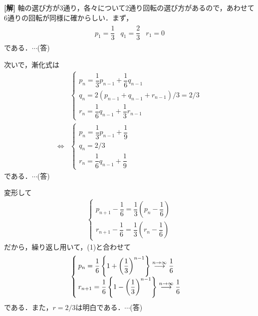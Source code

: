 \documentclass[a4j]{jarticle}
\begin{document}
\setlength{\columnseprule}{0.4pt}
\begin{multicols}{2}
{\bf[解]} 軸の選び方が$3$通り，各々について$2$通り回転の選び方があるので，あわせて$6$通りの回転が同様に確からしい．まず，
     \begin{align*}
          \begin{array}{lll}
          p_1=\dfrac{1}{3}&q_1=\dfrac{2}{3}&r_1=0
          \end{array}
     \end{align*}
である．$\cdots$(答)

次いで，漸化式は
     \begin{align*}
          &\begin{cases}
          p_n=\dfrac{1}{3}p_{n-1}+\dfrac{1}{6}q_{n-1} \\
          q_n=2(p_{n-1}+q_{n-1}+r_{n-1})/3=2/3 \\
          r_n=\dfrac{1}{6}q_{n-1}+\dfrac{1}{3}r_{n-1}
          \end{cases} \\
          \Longleftrightarrow
          &\begin{cases}
          p_n=\dfrac{1}{3}p_{n-1}+\dfrac{1}{9} \\
          q_n=2/3 \\
          r_n=\dfrac{1}{6}q_{n-1}+\dfrac{1}{9}
          \end{cases}
     \end{align*}
である．$\cdots$(答)

変形して
     \begin{align*}
          \begin{cases}
          p_{n+1}-\dfrac{1}{6}=\dfrac{1}{3}\left(p_n-\dfrac{1}{6}\right) \\
          r_{n+1}-\dfrac{1}{6}=\dfrac{1}{3}\left(r_n-\dfrac{1}{6}\right) 
          \end{cases}
     \end{align*}
だから，繰り返し用いて，(1)と合わせて
     \begin{align*}
          \begin{cases}
          p_n=\dfrac{1}{6}\left\{1+\left(\dfrac{1}{3}\right)^{n-1}\right\}\stackrel{n \to \infty}{\longrightarrow}\dfrac{1}{6} \\
          r_{n+1}=\dfrac{1}{6}\left\{1-\left(\dfrac{1}{3}\right)^{n-1}\right\} \stackrel{n \to \infty}{\longrightarrow}\dfrac{1}{6}
          \end{cases}
     \end{align*}     
である．また，$r=2/3$は明白である．$\cdots$(答)
\newpage
\end{multicols}
\end{document}
